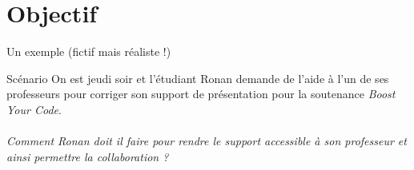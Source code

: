 \section{Objectif}

\begin{frame}{Un exemple (fictif mais réaliste !)}
  \begin{block}{Scénario}
  On est jeudi soir et l'étudiant Ronan demande de l'aide à l'un de ses
  professeurs pour corriger son support de présentation pour la soutenance
  \emph{Boost Your Code}.\\
  ~\\
  \emph{Comment Ronan doit il faire pour rendre le support accessible à son
  professeur et ainsi permettre la collaboration ?}
  \end{block}
\end{frame}

